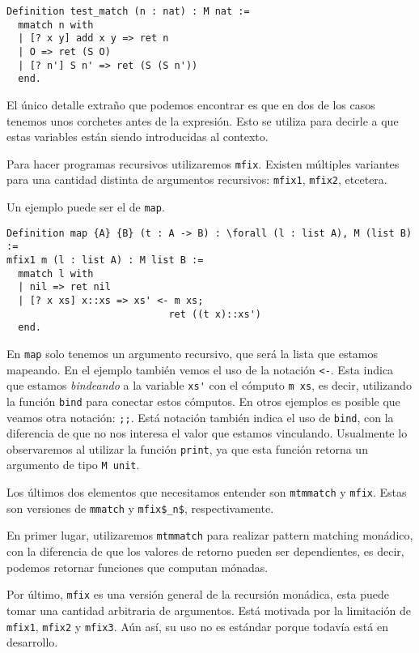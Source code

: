 \begin{lstlisting}
Definition test_match (n : nat) : M nat :=
  mmatch n with
  | [? x y] add x y => ret n
  | O => ret (S O)
  | [? n'] S n' => ret (S (S n'))
  end.
\end{lstlisting}

El único detalle extraño que podemos encontrar es que en dos de los casos tenemos unos corchetes antes de la expresión.
Esto se utiliza para decirle a \Mtac que estas variables están siendo introducidas al contexto.

Para hacer programas recursivos utilizaremos \lstinline{mfix}. Existen múltiples variantes para una cantidad distinta de argumentos recursivos: \lstinline{mfix1}, \lstinline{mfix2}, etcetera.

Un ejemplo puede ser el de \lstinline{map}.

\begin{lstlisting}
Definition map {A} {B} (t : A -> B) : \forall (l : list A), M (list B) :=
mfix1 m (l : list A) : M list B :=
  mmatch l with
  | nil => ret nil
  | [? x xs] x::xs => xs' <- m xs;
                            ret ((t x)::xs')
  end.
\end{lstlisting}

En \lstinline{map} solo tenemos un argumento recursivo, que será la lista que estamos mapeando.
En el ejemplo también vemos el uso de la notación \lstinline{<-}.
Esta indica que estamos \emph{bindeando} a la variable \lstinline{xs'} con el cómputo \lstinline{m xs}, es decir, utilizando la función \lstinline{bind} para conectar estos cómputos.
En otros ejemplos es posible que veamos otra notación: \lstinline{;;}.
Está notación también indica el uso de \lstinline{bind}, con la diferencia de que no nos interesa el valor que estamos vinculando.
Usualmente lo observaremos al utilizar la función \lstinline{print}, ya que esta función retorna un argumento de tipo \lstinline{M unit}.

Los últimos dos elementos que necesitamos entender son \lstinline{mtmmatch} y \lstinline{mfix}.
Estas son versiones de \lstinline{mmatch} y \lstinline{mfix$_n$}, respectivamente.

En primer lugar, utilizaremos \lstinline{mtmmatch} para realizar pattern matching monádico, con la diferencia de que los valores de retorno pueden ser dependientes, es decir, podemos retornar funciones que computan mónadas.

Por último, \lstinline{mfix} es una versión general de la recursión monádica, esta puede tomar una cantidad arbitraria de argumentos. Está motivada por la limitación de \lstinline{mfix1}, \lstinline{mfix2} y \lstinline{mfix3}.
Aún así, su uso no es estándar porque todavía está en desarrollo.

